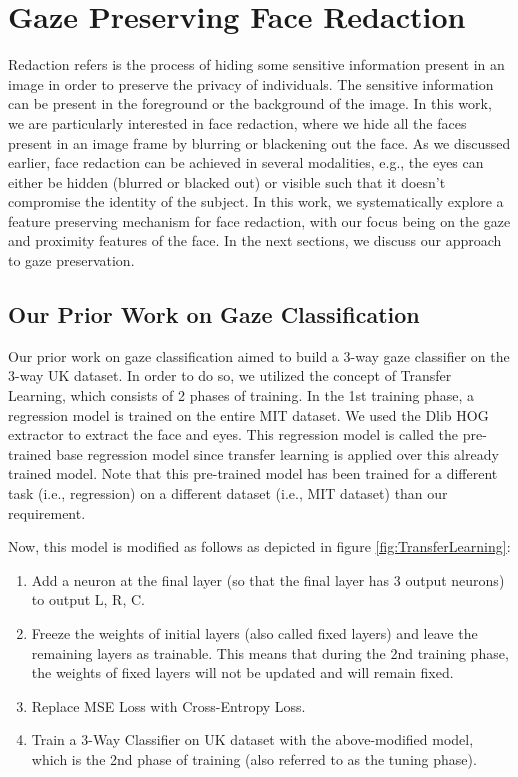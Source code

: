 \chapter{Gaze Preserving Face Redaction}

Redaction refers is the process of hiding some sensitive information present in an image in order to preserve the privacy of individuals. The sensitive information can be present in the foreground or the background of the image. In this work, we are particularly interested in face redaction, where we hide all the faces present in an image frame by blurring or blackening out the face. As we discussed earlier, face redaction can be achieved in several modalities, e.g., the eyes can either be hidden (blurred or blacked out) or visible such that it doesn't compromise the identity of the subject. In this work, we systematically explore a feature preserving mechanism for face redaction, with our focus being on the gaze and proximity features of the face. In the next sections, we discuss our approach to gaze preservation.


\section{Our Prior Work on Gaze Classification}
Our prior work on gaze classification aimed to build a 3-way gaze classifier on the 3-way UK dataset. In order to do so, we utilized the concept of Transfer Learning, which consists of 2 phases of training. In the 1st training phase, a regression model is trained on the entire MIT dataset. We used the Dlib HOG extractor to extract the face and eyes. This regression model is called the pre-trained base regression model since transfer learning is applied over this already trained model. Note that this pre-trained model has been trained for a different task (i.e., regression) on a different dataset (i.e., MIT dataset) than our requirement.

Now, this model is modified as follows as depicted in figure \ref{fig:TransferLearning}:
\begin{enumerate}
  \item Add a neuron at the final layer (so that the final layer has 3 output neurons) to output L, R, C.
  \item Freeze the weights of initial layers (also called fixed layers) and leave the remaining layers as trainable. This means that during the 2nd training phase, the weights of fixed layers will not be updated and will remain fixed.
  \item Replace MSE Loss with Cross-Entropy Loss.
  \item Train a 3-Way Classifier on UK dataset with the above-modified model, which is the 2nd phase of training (also referred to as the tuning phase).
\end{enumerate}

